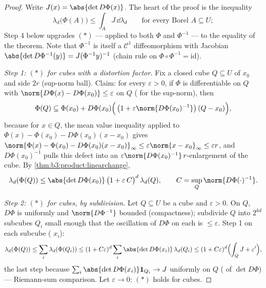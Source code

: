 \begin{proof}
Write $J(x) = \abs{\det D\Phi(x)}$. The heart of the proof is
the inequality
\[
\lambda_d\bigl(\Phi(A)\bigr) \leq \int_A J\,\dd\lambda_d
\qquad\text{for every Borel } A \subseteq U;
\tag{$*$}
\]
Step 4 below upgrades $(*)$ --- applied to both $\Phi$ and
$\Phi^{-1}$ --- to the equality of the theorem. Note that
$\Phi^{-1}$ is itself a $\mathcal C^1$ diffeomorphism with
Jacobian $\abs{\det D\Phi^{-1}(y)} = J(\Phi^{-1}y)^{-1}$
(chain rule on $\Phi\circ\Phi^{-1} = \mathrm{id}$).

\emph{Step 1: $(*)$ for cubes with a distortion factor.} Fix a
closed cube $Q \subseteq U$ of  $x_0$ and side $2r$
(sup-norm ball). Claim: for every $\varepsilon > 0$, if $\Phi$
is differentiable on $Q$ with
$\norm{D\Phi(x) - D\Phi(x_0)} \leq \varepsilon$ on $Q$
( for the sup-norm), then
\[
\Phi(Q) \subseteq \Phi(x_0) + D\Phi(x_0)\Bigl(\,\bigl(1 +
\varepsilon\norm{D\Phi(x_0)^{-1}}\bigr)\,(Q - x_0)\Bigr),
\]
because for $x \in Q$, the mean value inequality applied to
$\Phi(x) - \Phi(x_0) - D\Phi(x_0)(x - x_0)$ gives
$\norm{\Phi(x) - \Phi(x_0) - D\Phi(x_0)(x-x_0)}_\infty \leq
\varepsilon\norm{x - x_0}_\infty \leq \varepsilon r$, and
$D\Phi(x_0)^{-1}$ pulls this defect into an
$\varepsilon\norm{D\Phi(x_0)^{-1}}\,r$-enlargement of the cube.
By \cref{thm:b3:product:linearchange},
\[
\lambda_d(\Phi(Q)) \leq \abs{\det D\Phi(x_0)}\,
\bigl(1 + \varepsilon\,C\bigr)^{d}\,\lambda_d(Q),
\qquad C = \sup_{Q}\norm{D\Phi(\cdot)^{-1}} .
\]

\emph{Step 2: $(*)$ for  cubes, by subdivision.} Let $Q
\subseteq U$ be a  cube and $\varepsilon > 0$. On $Q$,
$D\Phi$ is uniformly  and $\norm{D\Phi^{-1}}$
bounded (compactness); subdivide $Q$ into $2^{kd}$ subcubes
$Q_i$ small enough that the oscillation of $D\Phi$ on each is
$\leq \varepsilon$. Step 1 on each subcube ( $x_i$):
\[
\lambda_d(\Phi(Q)) \leq \sum_i\lambda_d(\Phi(Q_i))
\leq (1 + C\varepsilon)^d \sum_i \abs{\det
D\Phi(x_i)}\,\lambda_d(Q_i)
\leq (1 + C\varepsilon)^d\Bigl(\int_Q J + \varepsilon'\Bigr),
\]
the last step because $\sum_i\abs{\det D\Phi(x_i)}\mathbf
1_{Q_i} \to J$ uniformly on $Q$ ( of $\det D\Phi$)
--- Riemann-sum comparison. Let $\varepsilon \to 0$: $(*)$
holds for  cubes.


\end{proof}

